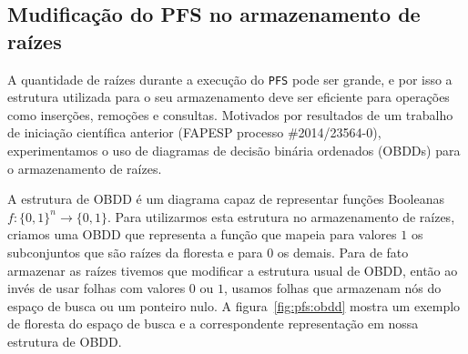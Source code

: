 \documentclass[12pt]{article}
\newcommand{\algname}[1]{\texttt{#1}}
\begin{document}
\subsection{Mudificação do PFS no armazenamento de raízes}
A quantidade de raízes durante a execução do \algname{PFS} pode ser 
grande, e por isso a estrutura utilizada para o seu armazenamento deve
ser eficiente para operações como inserções, remoções e consultas. 
Motivados por resultados de um trabalho de iniciação científica 
anterior (FAPESP processo \#2014/23564-0), experimentamos o uso de
diagramas de decisão binária ordenados (OBDDs) para o armazenamento
de raízes.

A estrutura de OBDD é um diagrama capaz de representar funções Booleanas
$f: \{0, 1\}^n \to \{0, 1\}$. Para utilizarmos esta estrutura no 
armazenamento de raízes, criamos uma OBDD que representa a função que 
mapeia para valores $1$ os subconjuntos que são raízes da floresta
e para $0$ os demais. Para de fato armazenar as raízes tivemos que 
modificar a estrutura usual de OBDD, então ao invés de usar folhas com 
valores $0$ ou $1$, usamos folhas que armazenam nós do espaço de busca
ou um ponteiro nulo. A figura~\ref{fig:pfs:obdd} mostra um exemplo de 
floresta do espaço de busca e a correspondente representação em nossa 
estrutura de OBDD. 
\end{document}
